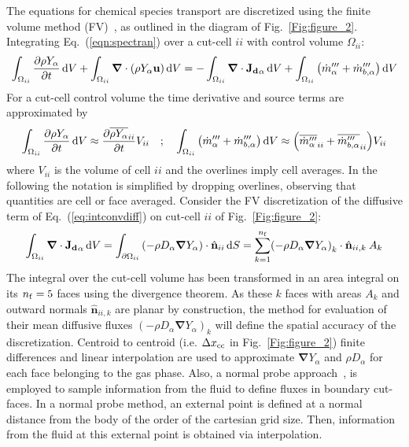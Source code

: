 \documentclass[journal,article,atmosphere,submit,moreauthors,pdftex]{Definitions/mdpi}
\newcommand{\dV}{{\rm d}V}
\newcommand{\dS}{{\rm d}S}
\begin{document}
The equations for chemical species transport are discretized using the finite volume method (FV)~\cite{eymard_2000,leveque_2002}, as outlined in the diagram of Fig.~\ref{Fig:figure_2}. Integrating Eq.~(\ref{eqn:spectran}) over a cut-cell $ii$ with control volume $\Omega_{ii}$:
\begin{equation}
 \int_{\Omega_{ii}} {\frac{\partial \rho Y_\alpha}{\partial t}} \, \dV + \int_{\Omega_{ii}} { \boldsymbol{\nabla} \cdot  \left(  \rho Y_\alpha \mathbf{u} \right)
      } \, \dV  = -\int_{\Omega_{ii}} { \boldsymbol{\nabla} \cdot \mathbf{J_{d}}_\alpha   } \, \dV + \int_{\Omega_{ii}} { \left( \dot{m}_\alpha'''+\dot{m}_{b,\alpha}''' \right) } \, \dV \label{eq:intconvdiff}
\end{equation}
For a cut-cell control volume the time derivative and source terms are approximated by
\begin{equation}
  \int_{\Omega_{ii}} {\frac{\partial \rho Y_\alpha}{\partial t}} \, \dV \approx \frac{\partial \overline{\rho Y_\alpha }_{ii}}{\partial t} V_{ii} \quad ; \quad
  \int_{\Omega_{ii}} { \left( \dot{m}_\alpha''' +\dot{m}_{b,\alpha}''' \right)} \, \dV \approx \left(\overline{ \dot{m}_\alpha''' }_{ii}+ \overline{\dot{m}_{b,\alpha}'''}_{ii} \right) V_{ii} \label{eq:intcons}
\end{equation}
where $V_{ii}$ is the volume of cell $ii$ and the overlines imply cell averages. In the following the notation is simplified by dropping overlines, observing that quantities are cell or face averaged. Consider the FV discretization of the diffusive term of Eq.~(\ref{eq:intconvdiff}) on cut-cell $ii$ of Fig.~\ref{Fig:figure_2}:
\begin{equation}
\int_{\Omega_{ii}} { \boldsymbol{\nabla} \cdot   \mathbf{J_{d}}_\alpha   } \, \dV =
    \int_{\partial \Omega_{ii}} { \left( - \rho D_\alpha \boldsymbol{\nabla} Y_\alpha \right) \cdot \hat{\mathbf{n}}_{ii} } \, \dS = \sum^{n_{\rm f}}_{k=1}
    \left( - \rho D_\alpha \boldsymbol{\nabla} Y_\alpha \right)_k \cdot \hat{\mathbf{n}}_{ii,k} \: A_k \label{eq:discfvdiffcc}
\end{equation}
The integral over the cut-cell volume has been transformed in an area integral on its $n_{\rm f}=5$ faces using the divergence theorem. As these $k$ faces with areas $A_k$ and outward normals $\hat{\mathbf{n}}_{ii,k}$ are planar by construction, the method for evaluation of their mean diffusive fluxes $\left( - \rho D_\alpha \boldsymbol{\nabla} Y_\alpha \right)_k$ will define the spatial accuracy of the discretization. Centroid to centroid (i.e. $\Delta x_{\rm cc}$ in Fig.~\ref{Fig:figure_2}) finite differences and linear interpolation are used to approximate $\boldsymbol{\nabla} Y_\alpha$ and $\rho D_\alpha$ for each face belonging to the gas phase. Also, a normal probe approach~\cite{balaras_2004}, is employed to sample information from the fluid to define fluxes in boundary cut-faces. In a normal probe method, an external point is defined at a normal distance from the body of the order of the cartesian grid size. Then, information from the fluid at this external point is obtained via interpolation. 
\end{document}
